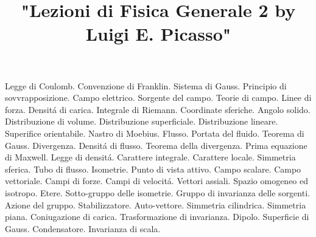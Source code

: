 

\usepackage[italian]{babel}

\title{"Lezioni di Fisica Generale 2 by Luigi E. Picasso"}


\maketitle

\begin{multicols}{3}
  Legge di Coulomb. Convenzione di Franklin. Sistema di Gauss. Principio di sovvrapposizione.
  Campo elettrico. Sorgente del campo. Teorie di campo. Linee di forza. Densit\'a di carica.
  Integrale di Riemann. Coordinate sferiche. Angolo solido. Distribuzione di volume.
  Distribuzione superficiale. Distribuzione lineare. Superifice orientabile. Nastro di Moebius. Flusso.
  Portata del fluido. Teorema di Gauss. Divergenza. Densit\'a di flusso. Teorema della divergenza.
  Prima equazione di Maxwell. Legge di densit\'a. Carattere integrale. Carattere locale. Simmetria sferica.
  Tubo di flusso. Isometrie. Punto di vista attivo. Campo scalare. Campo vettoriale. Campi di forze.
  Campi di velocit\'a. Vettori assiali. Spazio omogeneo ed isotropo. Etere. Sotto-gruppo delle isometrie.
  Gruppo di invarianza delle sorgenti. Azione del gruppo. Stabilizzatore. Auto-vettore. Simmetria cilindrica.
  Simmetria piana. Coniugazione di carica. Trasformazione di invarianza. Dipolo. Superficie di Gauss. Condensatore.
  Invarianza di scala.
\end{multicols}

